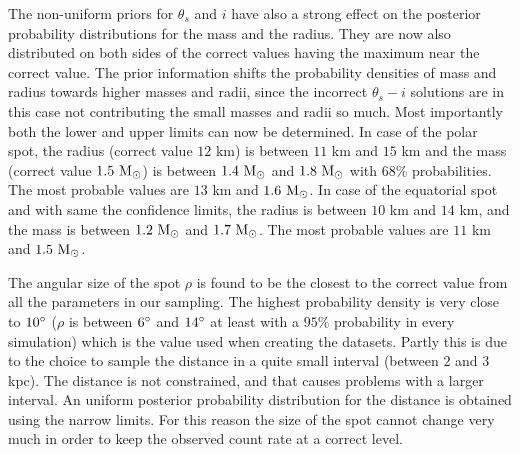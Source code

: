 \documentclass{wihuri}
\def\msun{{\rm M_{\odot}}}
\def\thetas{\theta_{s}}
\begin{document}
The non-uniform priors for $\thetas$ and $i$ have also a strong effect on the posterior probability distributions for the mass and the radius. They are now also distributed on both sides of the correct values having the maximum near the correct value. The prior information shifts the probability densities of mass and radius towards higher masses and radii, since the incorrect $\thetas - i$ solutions are in this case not contributing the small masses and radii so much. Most importantly both the lower and upper limits can now be determined. In case of the polar spot, the radius (correct value $12$ km) is between $11$ km and $15$ km and the mass (correct value $1.5 ~\msun$) is between $1.4 ~\msun$ and $1.8 ~\msun$ with $68 \%$ probabilities. The most probable values are $13$ km and $1.6 ~\msun$. In case of the equatorial spot and with same the confidence limits, the radius is between $10$ km and $14$ km, and the mass is between $1.2 ~\msun$ and $1.7 ~\msun$. The most probable values are $11$ km and $1.5 ~\msun$. 

The angular size of the spot $\rho$ is found to be the closest to the correct value from all the  parameters in our sampling. The highest probability density is very close to $10 \degree$ ($\rho$ is between $6 \degree$ and $14 \degree$ at least with a $95 \%$ probability in every simulation) which is the value used when creating the datasets. Partly this is due to the choice to sample the distance in a quite small interval (between $2$ and $3$ kpc). The distance is not constrained, and that causes problems with a larger interval. An uniform posterior probability distribution for the distance is obtained using the narrow limits. For this reason the size of the spot cannot change very much in order to keep the observed count rate at a correct level.
\end{document}
